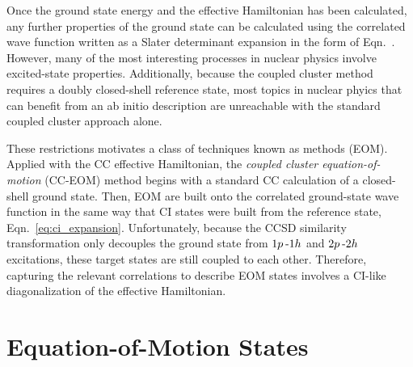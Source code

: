 \documentclass[thesis.tex]{subfiles}
\begin{document}
Once the ground state energy and the effective Hamiltonian has been calculated, any further properties of the ground state can be calculated using the correlated wave function written as a Slater determinant expansion in the form of Eqn.\ \cite{eq:cc_ansatz}.  However, many of the most interesting processes in nuclear physics involve excited-state properties.  Additionally, because the coupled cluster method requires a doubly closed-shell reference state, most topics in nuclear phyics that can benefit from an ab initio description are unreachable with the standard coupled cluster approach alone.

These restrictions motivates a class of techniques known as  methods (EOM).  Applied with the CC effective Hamiltonian, the \textit{coupled cluster equation-of-motion} (CC-EOM) method begins with a standard CC calculation of a closed-shell ground state.  Then, EOM  are built onto the correlated ground-state wave function in the same way that CI states were built from the reference state, Eqn.\ \eqref{eq:ci_expansion}.  Unfortunately, because the CCSD similarity transformation only decouples the ground state from $1p\hspace{2pt}\text{-}1h$ and $2p\hspace{2pt}\text{-}2h$ excitations, these target states are still coupled to each other.  Therefore, capturing the relevant correlations to describe EOM states involves a CI-like diagonalization of the effective Hamiltonian.


\section{Equation-of-Motion States} \label{section:eom_target_states}
\end{document}

